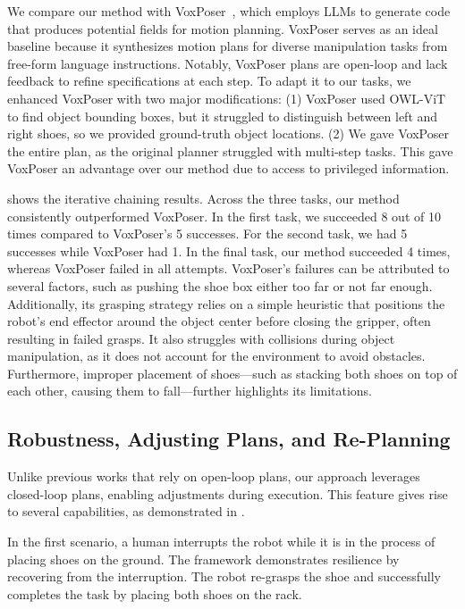 We compare our method with VoxPoser~\cite{huang2023voxposer}, which employs LLMs to generate code that produces potential fields for motion planning. VoxPoser serves as an ideal baseline because it synthesizes motion plans for diverse manipulation tasks from free-form language instructions. Notably, VoxPoser plans are open-loop and lack feedback to refine specifications at each step. To adapt it to our tasks, we enhanced VoxPoser with two major modifications: (1) VoxPoser used OWL-ViT~\cite{minderer2022simple} to find object bounding boxes, but it struggled to distinguish between left and right shoes, so we provided ground-truth object locations. (2) We gave VoxPoser the entire plan, as the original planner struggled with multi-step tasks. This gave VoxPoser an advantage over our method due to access to privileged information.

 shows the iterative chaining results. Across the three tasks, our method consistently outperformed VoxPoser. In the first task, we succeeded 8 out of 10 times compared to VoxPoser's 5 successes. For the second task, we had 5 successes while VoxPoser had 1. In the final task, our method succeeded 4 times, whereas VoxPoser failed in all attempts. VoxPoser's failures can be attributed to several factors, such as pushing the shoe box either too far or not far enough. Additionally, its grasping strategy relies on a simple heuristic that positions the robot's end effector around the object center before closing the gripper, often resulting in failed grasps. It also struggles with collisions during object manipulation, as it does not account for the environment to avoid obstacles. Furthermore, improper placement of shoes—such as stacking both shoes on top of each other, causing them to fall—further highlights its limitations.





\subsection{Robustness, Adjusting Plans, and Re-Planning}
Unlike previous works that rely on open-loop plans, our approach leverages closed-loop plans, enabling adjustments during execution. This feature gives rise to several capabilities, as demonstrated in .

In the first scenario, a human interrupts the robot while it is in the process of placing shoes on the ground. The framework demonstrates resilience by recovering from the interruption. The robot re-grasps the shoe and successfully completes the task by placing both shoes on the rack.

